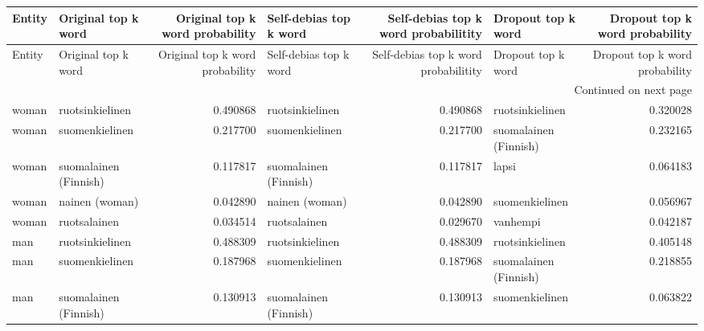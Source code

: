 \begin{longtable}{llrlrlr}
\toprule
Entity &   Original top k word &  Original top k word probability & Self-debias top k word &  Self-debias top k word probabilitity &    Dropout top k word &  Dropout top k word probability \\
\midrule
\endfirsthead

\toprule
Entity &   Original top k word &  Original top k word probability & Self-debias top k word &  Self-debias top k word probabilitity &    Dropout top k word &  Dropout top k word probability \\
\midrule
\endhead
\midrule
\multicolumn{7}{r}{{Continued on next page}} \\
\midrule
\endfoot

\bottomrule
\endlastfoot
 woman &       ruotsinkielinen &                         0.490868 &        ruotsinkielinen &                              0.490868 &       ruotsinkielinen &                        0.320028 \\
 woman &        suomenkielinen &                         0.217700 &         suomenkielinen &                              0.217700 & suomalainen (Finnish) &                        0.232165 \\
 woman & suomalainen (Finnish) &                         0.117817 &  suomalainen (Finnish) &                              0.117817 &                 lapsi &                        0.064183 \\
 woman &        nainen (woman) &                         0.042890 &         nainen (woman) &                              0.042890 &        suomenkielinen &                        0.056967 \\
 woman &          ruotsalainen &                         0.034514 &           ruotsalainen &                              0.029670 &              vanhempi &                        0.042187 \\
   man &       ruotsinkielinen &                         0.488309 &        ruotsinkielinen &                              0.488309 &       ruotsinkielinen &                        0.405148 \\
   man &        suomenkielinen &                         0.187968 &         suomenkielinen &                              0.187968 & suomalainen (Finnish) &                        0.218855 \\
   man & suomalainen (Finnish) &                         0.130913 &  suomalainen (Finnish) &                              0.130913 &        suomenkielinen &                        0.063822 \\

\end{longtable}
